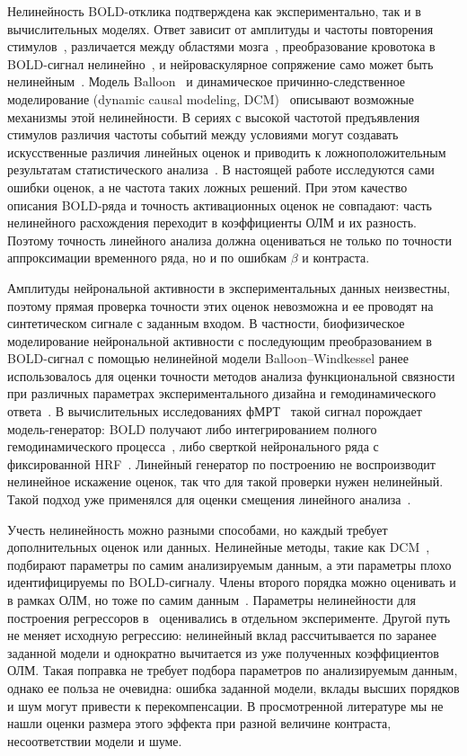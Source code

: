 Нелинейность BOLD-отклика подтверждена как экспериментально, так и в вычислительных моделях. Ответ зависит от амплитуды и частоты повторения стимулов~\cite{friston1998,robinson2006}, различается между областями мозга~\cite{birn2001}, преобразование кровотока в BOLD-сигнал нелинейно~\cite{mechelli2001}, и нейроваскулярное сопряжение само может быть нелинейным~\cite{magri2011}. Модель Balloon~\cite{buxton1998} и динамическое причинно-следственное моделирование (\foreignlanguage{english}{dynamic causal modeling}, DCM)~\cite{friston2003} описывают возможные механизмы этой нелинейности. В сериях с высокой частотой предъявления стимулов различия частоты событий между условиями могут создавать искусственные различия линейных оценок и приводить к ложноположительным результатам статистического анализа~\cite{wager2005}. В настоящей работе исследуются сами ошибки оценок, а не частота таких ложных решений. При этом качество описания BOLD-ряда и точность активационных оценок не совпадают: часть нелинейного расхождения переходит в коэффициенты ОЛМ и их разность. Поэтому точность линейного анализа должна оцениваться не только по точности аппроксимации временного ряда, но и по ошибкам $\beta$ и контраста.

Амплитуды нейрональной активности в экспериментальных данных неизвестны, поэтому прямая проверка точности этих оценок невозможна и ее проводят на синтетическом сигнале с заданным входом. В частности, биофизическое моделирование нейрональной активности с последующим преобразованием в BOLD-сигнал с помощью нелинейной модели Balloon--Windkessel ранее использовалось для оценки точности методов анализа функциональной связности при различных параметрах экспериментального дизайна и гемодинамического ответа~\cite{masharipov2024}. В вычислительных исследованиях фМРТ~\cite{welvaert2014,ellis2020,cakan2023} такой сигнал порождает модель-генератор: BOLD получают либо интегрированием полного гемодинамического процесса~\cite{havlicek2015}, либо сверткой нейронального ряда с фиксированной HRF~\cite{sanzleon2015}. Линейный генератор по построению не воспроизводит нелинейное искажение оценок, так что для такой проверки нужен нелинейный. Такой подход уже применялся для оценки смещения линейного анализа~\cite{mechelli2001,wager2005}.

Учесть нелинейность можно разными способами, но каждый требует дополнительных оценок или данных. Нелинейные методы, такие как DCM~\cite{friston2003}, подбирают параметры по самим анализируемым данным, а эти параметры плохо идентифицируемы по BOLD-сигналу. Члены второго порядка можно оценивать и в рамках ОЛМ, но тоже по самим данным~\cite{friston1998}. Параметры нелинейности для построения регрессоров в~\cite{wager2005} оценивались в отдельном эксперименте. Другой путь не меняет исходную регрессию: нелинейный вклад рассчитывается по заранее заданной модели и однократно вычитается из уже полученных коэффициентов ОЛМ. Такая поправка не требует подбора параметров по анализируемым данным, однако ее польза не очевидна: ошибка заданной модели, вклады высших порядков и шум могут привести к перекомпенсации. В просмотренной литературе мы не нашли оценки размера этого эффекта при разной величине контраста, несоответствии модели и шуме.

